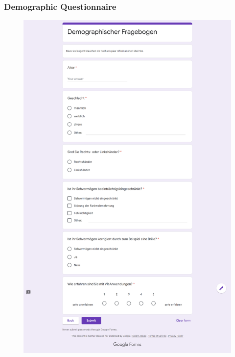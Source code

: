 \subsubsection{Demographic Questionnaire}
\begin{figure}[!h]
\centering
\includegraphics[width=\textwidth]{figures/Appendix/demographic questionair.png}
\end{figure}

